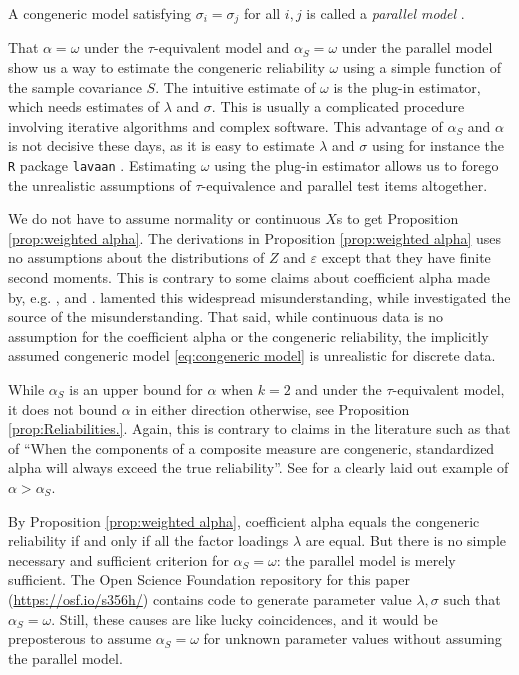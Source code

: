 \documentclass[twoside]{article}
\begin{document}
A congeneric model satisfying $\sigma_{i}=\sigma_{j}$ for all $i,j$ is called a \textit{parallel model} \citep[][section 2.13]{Lord1968-ax}. 

That $\alpha = \omega$ under the $\tau$-equivalent model and $\alpha_S = \omega$ under the parallel model show us a way to estimate the congeneric reliability $\omega$ using a simple function of the sample covariance $S$. The intuitive estimate of $\omega$ is the plug-in estimator, which needs estimates of $\lambda$ and $\sigma$. This is usually a complicated procedure involving iterative algorithms and complex software. This advantage of $\alpha_S$ and $\alpha$ is not decisive these days, as it is easy to estimate $\lambda$ and $\sigma$ using for instance the \texttt{R} \citep{Team2013-tt} package \texttt{lavaan} \citep{Rosseel2012-yg}. Estimating $\omega$ using the plug-in estimator allows us to forego the unrealistic assumptions of $\tau$-equivalence and parallel test items altogether.

\begin{rem}
We do not have to assume normality or continuous $X$s to get Proposition \ref{prop:weighted alpha}. The derivations in Proposition \ref{prop:weighted alpha} uses no assumptions about the distributions of $Z$ and $\varepsilon$ except that they have finite second moments. This is contrary to some claims about coefficient alpha made by, e.g. \citet[][p.415]{McNeish2018-vu}, \citet[][p.21]{Zumbo2007-ap} and \citet[][p. 1185]{Zumbo2019-lm}. \citet{Raykov2019-yr} lamented this widespread misunderstanding, while \citet[][p. 1060]{Chalmers2018-fj} investigated the source of the misunderstanding. That said, while continuous data is no assumption for the coefficient alpha or the congeneric reliability, the implicitly assumed congeneric model \eqref{eq:congeneric model} is unrealistic for discrete data. 
\end{rem}
\begin{rem}
While $\alpha_S$ is an upper bound for $\alpha$ when $k = 2$ and under the $\tau$-equivalent model, it does not bound $\alpha$ in either direction otherwise, see Proposition \ref{prop:Reliabilities.}. Again, this is contrary to claims in the literature such as that of \citet[][p.348]{Osburn2000-jd} \enquote{When the components of a composite measure are congeneric, standardized alpha will always exceed the true reliability}. See \citep[][p.450]{Falk2011-ae} for a clearly laid out example of $\alpha>\alpha_S$.
\end{rem}

By Proposition \ref{prop:weighted alpha}, coefficient alpha equals the congeneric reliability if and only if all the factor loadings $\lambda$ are equal. But there is no simple necessary and sufficient criterion for $\alpha_S = \omega$: the parallel model is merely sufficient. The Open Science Foundation repository for this paper (\url{https://osf.io/s356h/}) contains code to generate parameter value $\lambda,\sigma$ such that $\alpha_S = \omega$. Still, these causes are like lucky coincidences, and it would be preposterous to assume $\alpha_S = \omega$ for unknown parameter values without assuming the parallel model.
\end{document}
